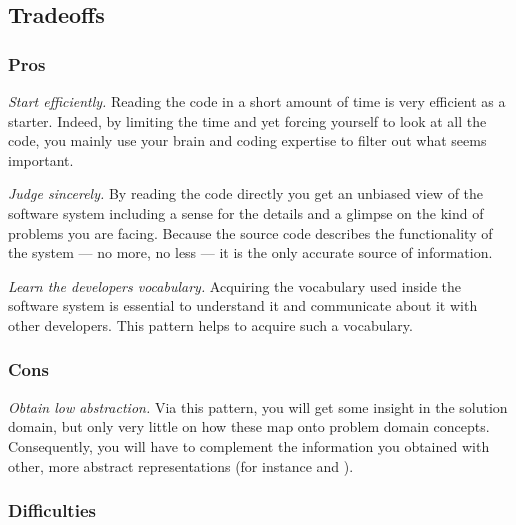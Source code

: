 \documentclass[a4paper,10pt,twoside]{book}
\begin{document}
\subsection*{Tradeoffs}

\subsubsection*{Pros}
\begin{bulletlist}
  \item \emph{Start efficiently.}
Reading the code in a short amount of time is very efficient as a starter. Indeed, by limiting the time and yet forcing yourself to look at all the code, you mainly use your brain and coding expertise to filter out what seems important.

  \item \emph{Judge sincerely.}
By reading the code directly you get an unbiased view of the software system including a sense for the details and a glimpse on the kind of problems you are facing. Because the source code describes the functionality of the system --- no more, no less --- it is the only accurate source of information.

  \item \emph{Learn the developers vocabulary.}
Acquiring the vocabulary used inside the software system is essential to understand it and communicate about it with other developers. This pattern helps to acquire such a vocabulary.

\end{bulletlist}

\subsubsection*{Cons}
\begin{bulletlist}
  \item \emph{Obtain low abstraction.}
Via this pattern, you will get some insight in the solution domain, but only very little on how these map onto problem domain concepts. Consequently, you will have to complement the information you obtained with other, more abstract representations (for instance  and ).
\end{bulletlist}

\subsubsection*{Difficulties}
\end{document}
